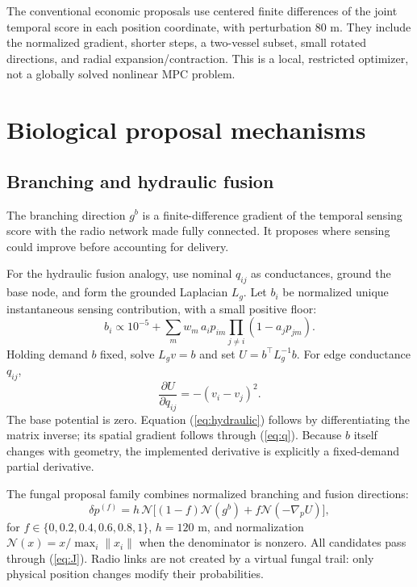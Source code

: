 The conventional economic proposals use centered finite differences of the
joint temporal score in each position coordinate, with perturbation 80 m.
They include the normalized gradient, shorter steps, a two-vessel subset,
small rotated directions, and radial expansion/contraction. This is a local,
restricted optimizer, not a globally solved nonlinear MPC problem.

\section{Biological proposal mechanisms}
\subsection{Branching and hydraulic fusion}
The branching direction $g^b$ is a finite-difference gradient of the temporal
sensing score with the radio network made fully connected. It proposes where
sensing could improve before accounting for delivery.

For the hydraulic fusion analogy, use nominal $q_{ij}$ as conductances, ground
the base node, and form the grounded Laplacian $L_g$. Let $b_i$ be normalized
unique instantaneous sensing contribution, with a small positive floor:
\begin{equation}
 b_i\propto 10^{-5}+\sum_m w_m\,a_ip_{im}
                       \prod_{j\ne i}(1-a_jp_{jm}).
\end{equation}
Holding demand $b$ fixed, solve $L_gv=b$ and set $U=b^\top L_g^{-1}b$.
For edge conductance $q_{ij}$,
\begin{equation}
 \frac{\partial U}{\partial q_{ij}}=-(v_i-v_j)^2.\label{eq:hydraulic}
\end{equation}
The base potential is zero. Equation (\ref{eq:hydraulic}) follows by
differentiating the matrix inverse; its spatial gradient follows through
(\ref{eq:q}). Because $b$ itself changes with geometry, the implemented
derivative is explicitly a fixed-demand partial derivative.

The fungal proposal family combines normalized branching and fusion directions:
\begin{equation}
 \delta p^{(f)}=h\,\mathcal N\big[(1-f)\mathcal N(g^b)
                       +f\mathcal N(-\nabla_p U)\big],
\end{equation}
for $f\in\{0,0.2,0.4,0.6,0.8,1\}$, $h=120$ m, and normalization
$\mathcal N(x)=x/\max_i\|x_i\|$ when the denominator is nonzero.
All candidates pass through (\ref{eq:J}). Radio links are not created by a
virtual fungal trail: only physical position changes modify their probabilities.

